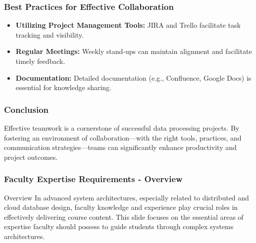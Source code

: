 \documentclass[aspectratio=169]{beamer}
\begin{document}
\begin{frame}[fragile]
    \frametitle{Best Practices for Effective Collaboration}
    \begin{itemize}
        \item \textbf{Utilizing Project Management Tools:} JIRA and Trello facilitate task tracking and visibility.
        \item \textbf{Regular Meetings:} Weekly stand-ups can maintain alignment and facilitate timely feedback.
        \item \textbf{Documentation:} Detailed documentation (e.g., Confluence, Google Docs) is essential for knowledge sharing.
    \end{itemize}
\end{frame}

\begin{frame}[fragile]
    \frametitle{Conclusion}
    \begin{block}{}
        Effective teamwork is a cornerstone of successful data processing projects. By fostering an environment of collaboration—with the right tools, practices, and communication strategies—teams can significantly enhance productivity and project outcomes.
    \end{block}
\end{frame}

\begin{frame}[fragile]
    \frametitle{Faculty Expertise Requirements - Overview}
    \begin{block}{Overview}
        In advanced system architectures, especially related to distributed and cloud database design, faculty knowledge and experience play crucial roles in effectively delivering course content. This slide focuses on the essential areas of expertise faculty should possess to guide students through complex systems architectures.
    \end{block}
\end{frame}
\end{document}
